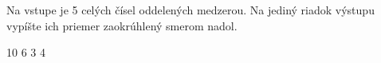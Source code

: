 




Na vstupe je 5 celých čísel oddelených medzerou. Na jediný riadok výstupu vypíšte ich priemer zaokrúhlený smerom nadol.

 10 6 3 4
\koniec


